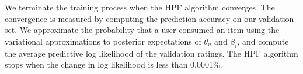 
We terminate the training process when the HPF algorithm
converges. The convergence is measured by computing the prediction
accuracy on our validation set. We approximate the probability that a
user consumed an item using the variational approximations to
posterior expectations of $\theta_u$ and $\beta_i$, and compute the
average predictive log likelihood of the validation ratings. The HPF
algorithm stops when the change in log likelihood is less than
0.0001\%.
